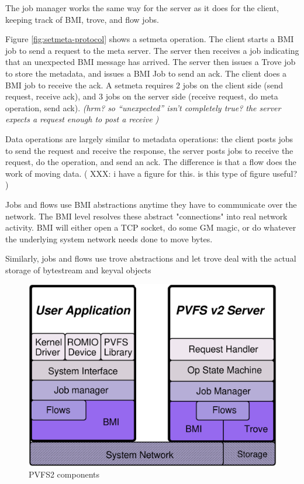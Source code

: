 \documentclass[10pt]{article} %
\begin{document}
The job manager works the same way for the server as it does for the
client, keeping track of BMI, trove, and flow jobs.  

Figure \ref{fig:setmeta-protocol} shows a setmeta operation.  The client
starts a BMI job to send a request to the meta server.  The server then
receives a job indicating that an unexpected BMI message has arrived.
The server then issues a Trove job to store the metadata, and issues a
BMI Job to send an ack.  The client does a BMI job to receive the ack. 
A setmeta requires 2 jobs on the client side (send request, receive          
ack), and 3 jobs on the server side (receive request, do meta operation,        
send ack).  {\em (hrm? so ``unexpected'' isn't completely true? the
server expects a request enough to post a receive )}

Data operations are largely similar to metadata operations:
the client posts jobs to send the request and receive the response, the
server posts jobs to receive the request, do the operation, and send an
ack.  The difference is that a flow does the work of moving data. ( XXX:
i have a figure for this.  is this type of figure useful? )

Jobs and flows use BMI abstractions anytime they have to communicate
over the network.  The BMI level resolves these abstract "connections"
into real network activity.  BMI will either open a TCP socket, do some
GM magic, or do whatever the underlying system network needs done to
move bytes. 

Similarly, jobs and flows use trove abstractions and let trove deal with
the actual storage of bytestream and keyval objects


\begin{figure}
\centering
\includegraphics[scale=0.25]{interface-model.eps}
\caption{PVFS2 components \label{fig:interface-model}}
\end{figure}
\end{document}
